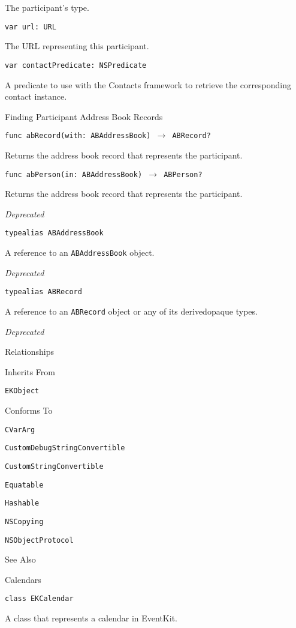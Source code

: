 \documentclass{article}
\begin{document}
The participant's type.

\texttt{var url: URL}

The URL representing this participant.

\texttt{var contactPredicate: NSPredicate}

A predicate to use with the Contacts framework to retrieve the corresponding contact instance.

Finding Participant Address Book Records

\texttt{func abRecord(with: ABAddressBook) $\rightarrow$ ABRecord?}

Returns the address book record that represents the participant.

\texttt{func abPerson(in: ABAddressBook) $\rightarrow$ ABPerson?}

Returns the address book record that represents the participant.

\textit{Deprecated}

\texttt{typealias ABAddressBook}

A reference to an \texttt{ABAddressBook} object.

\textit{Deprecated}

\texttt{typealias ABRecord}

A reference to an \texttt{ABRecord} object or any of its derivedopaque types.

\textit{Deprecated}

Relationships

Inherits From

\texttt{EKObject}

Conforms To

\texttt{CVarArg}

\texttt{CustomDebugStringConvertible}

\texttt{CustomStringConvertible}

\texttt{Equatable}

\texttt{Hashable}

\texttt{NSCopying}

\texttt{NSObjectProtocol}

See Also

Calendars

\texttt{class EKCalendar}

A class that represents a calendar in EventKit.

\newpage
\end{document}
